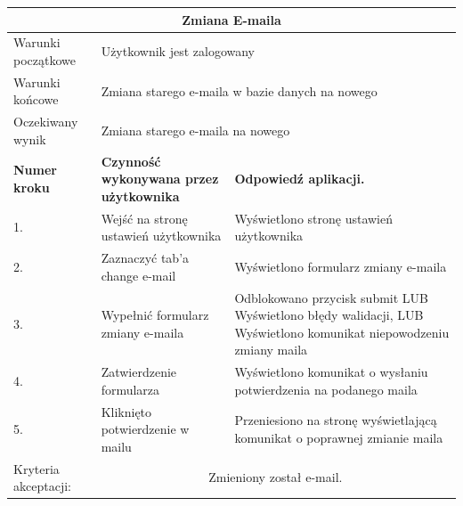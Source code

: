 \documentclass[a4paper,11pt]{report}
\begin{document}
\begin{table}[H]
	\centering
	\begin{tabular}{|p{2cm}|p{6cm}|p{6cm}|}
	\hline
	\multicolumn{3}{|c|}{\textbf{Zmiana E-maila}}\\
	\hline
	Warunki początkowe & \multicolumn{2}{|p{12cm}|}{Użytkownik jest zalogowany}\\
	\hline
	Warunki końcowe & \multicolumn{2}{|p{12cm}|}{Zmiana starego e-maila w bazie danych na nowego}\\
	\hline
	Oczekiwany wynik & \multicolumn{2}{|p{12cm}|}{Zmiana starego e-maila na nowego}\\
	\hline
	\textbf{Numer kroku} & \textbf{Czynność wykonywana przez użytkownika} & \textbf{Odpowiedź aplikacji.} \\
	\hline
	1. & Wejść na stronę ustawień użytkownika & Wyświetlono stronę ustawień użytkownika \\
	\hline
	2. & Zaznaczyć tab'a change e-mail & Wyświetlono formularz zmiany e-maila \\
	\hline
	3. & Wypełnić formularz zmiany e-maila & Odblokowano przycisk submit
	LUB Wyświetlono błędy walidacji,
	LUB Wyświetlono komunikat niepowodzeniu zmiany maila \\
	\hline
	4. & Zatwierdzenie formularza & Wyświetlono komunikat o wysłaniu potwierdzenia na podanego maila \\
	\hline
	5. & Kliknięto potwierdzenie w mailu & Przeniesiono na stronę wyświetlającą komunikat o poprawnej zmianie maila \\
	\hline
	Kryteria akceptacji: & \multicolumn{2}{|c|}{Zmieniony został e-mail.} \\
	\hline
	\end{tabular}
\end{table}
\end{document}
